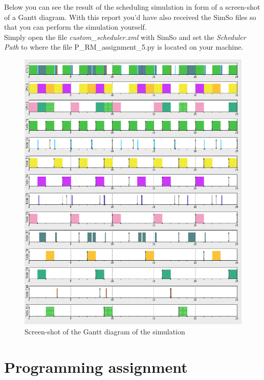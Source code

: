 \documentclass[a4paper]{article}
\begin{document}
\newpage

Below you can see the result of the scheduling simulation in form of a screen-shot of a Gantt diagram. With this report you'd have also received the SimSo files so that you can perform the simulation yourself.\\
Simply open the file \textit{custom\_scheduler.xml} with SimSo and set the \textit{Scheduler Path} to where the file P\_RM\_assignment\_5.py is located on your machine. \\

\begin{figure}[!ht]
\begin{center}
\includegraphics[width=\textwidth]{Gantt_P_RM_First_Fit.png}
\caption{Screen-shot of the Gantt diagram of the simulation}
\end{center}
\end{figure}


\newpage


\section{Programming assignment}
\end{document}

